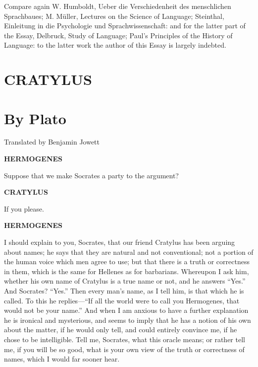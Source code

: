 \documentclass[11pt,letter]{article}
\begin{document}
\par  [2] Compare again W. Humboldt, Ueber die Verschiedenheit des menschlichen Sprachbaues; M. Müller, Lectures on the Science of Language; Steinthal, Einleitung in die Psychologie und Sprachwissenschaft: and for the latter part of the Essay, Delbruck, Study of Language; Paul’s Principles of the History of Language: to the latter work the author of this Essay is largely indebted.

\par 
 \section{CRATYLUS}\section{By Plato}
\par  Translated by Benjamin Jowett
 
\par \textbf{HERMOGENES}
\par   Suppose that we make Socrates a party to the argument?

\par \textbf{CRATYLUS}
\par   If you please.

\par \textbf{HERMOGENES}
\par   I should explain to you, Socrates, that our friend Cratylus has been arguing about names; he says that they are natural and not conventional; not a portion of the human voice which men agree to use; but that there is a truth or correctness in them, which is the same for Hellenes as for barbarians. Whereupon I ask him, whether his own name of Cratylus is a true name or not, and he answers “Yes.” And Socrates? “Yes.” Then every man’s name, as I tell him, is that which he is called. To this he replies—“If all the world were to call you Hermogenes, that would not be your name.” And when I am anxious to have a further explanation he is ironical and mysterious, and seems to imply that he has a notion of his own about the matter, if he would only tell, and could entirely convince me, if he chose to be intelligible. Tell me, Socrates, what this oracle means; or rather tell me, if you will be so good, what is your own view of the truth or correctness of names, which I would far sooner hear.
\end{document}
